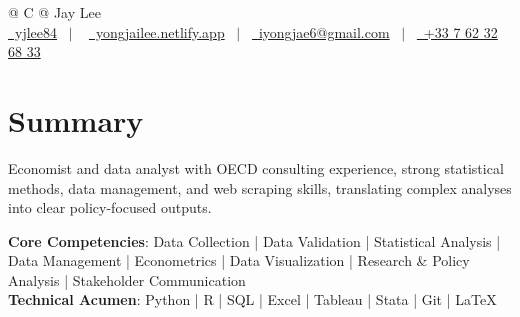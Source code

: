 \documentclass[a4paper,12pt]{article}
\begin{document}
\pagestyle{empty} 



\begin{tabularx}{\linewidth}{@{} C @{}}
\Huge{Jay Lee} \\[7.5pt]
\href{https://github.com/yjlee84}{\raisebox{-0.05\height}\faGithub\ yjlee84} \ $|$ \ 
\href{https://yongjailee.netlify.app}{\raisebox{-0.05\height}\faGlobe \ yongjailee.netlify.app} \ $|$ \ 
\href{mailto:email@mysite.com}{\raisebox{-0.05\height}\faEnvelope \ iyongjae6@gmail.com} \ $|$ \ 
\href{tel:+000000000000}{\raisebox{-0.05\height}\faMobile \ +33 7 62 32 68 33} \\
\end{tabularx}


\section{Summary}
Economist and data analyst with OECD consulting experience, strong statistical methods, data management, and web scraping skills, translating complex analyses into clear policy-focused outputs.

\textbf{Core Competencies}: Data Collection | Data Validation | Statistical Analysis | Data Management | Econometrics | Data Visualization | Research \& Policy Analysis | Stakeholder Communication\\
\textbf{Technical Acumen}: Python | R | SQL | Excel | Tableau | Stata | Git | \LaTeX{}
\end{document}
